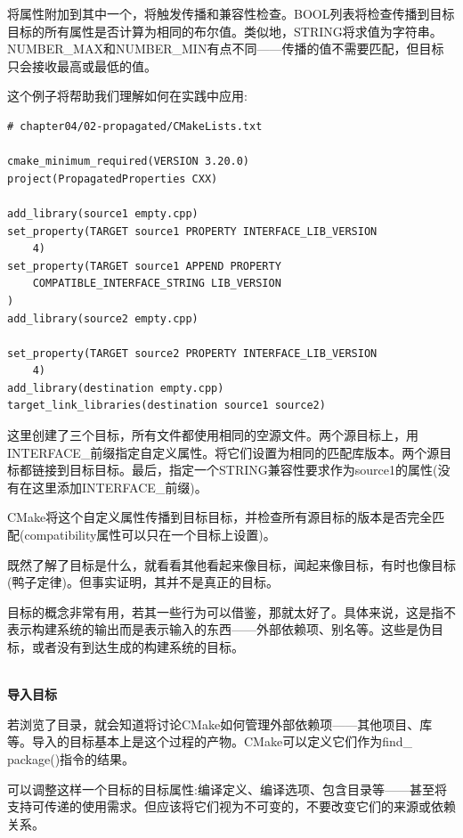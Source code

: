 将属性附加到其中一个，将触发传播和兼容性检查。BOOL列表将检查传播到目标目标的所有属性是否计算为相同的布尔值。类似地，STRING将求值为字符串。NUMBER\_MAX和NUMBER\_MIN有点不同——传播的值不需要匹配，但目标只会接收最高或最低的值。

这个例子将帮助我们理解如何在实践中应用:

\begin{lstlisting}[style=styleCMake]
# chapter04/02-propagated/CMakeLists.txt

cmake_minimum_required(VERSION 3.20.0)
project(PropagatedProperties CXX)

add_library(source1 empty.cpp)
set_property(TARGET source1 PROPERTY INTERFACE_LIB_VERSION
	4)
set_property(TARGET source1 APPEND PROPERTY
	COMPATIBLE_INTERFACE_STRING LIB_VERSION
)
add_library(source2 empty.cpp)

set_property(TARGET source2 PROPERTY INTERFACE_LIB_VERSION
	4)
add_library(destination empty.cpp)
target_link_libraries(destination source1 source2)
\end{lstlisting}

这里创建了三个目标，所有文件都使用相同的空源文件。两个源目标上，用INTERFACE\_前缀指定自定义属性。将它们设置为相同的匹配库版本。两个源目标都链接到目标目标。最后，指定一个STRING兼容性要求作为source1的属性(没有在这里添加INTERFACE\_前缀)。

CMake将这个自定义属性传播到目标目标，并检查所有源目标的版本是否完全匹配(compatibility属性可以只在一个目标上设置)。

既然了解了目标是什么，就看看其他看起来像目标，闻起来像目标，有时也像目标(鸭子定律)。但事实证明，其并不是真正的目标。


目标的概念非常有用，若其一些行为可以借鉴，那就太好了。具体来说，这是指不表示构建系统的输出而是表示输入的东西——外部依赖项、别名等。这些是伪目标，或者没有到达生成的构建系统的目标。

\hspace*{\fill} \\ %
\noindent
\textbf{导入目标}

若浏览了目录，就会知道将讨论CMake如何管理外部依赖项——其他项目、库等。导入的目标基本上是这个过程的产物。CMake可以定义它们作为find\_ package()指令的结果。

可以调整这样一个目标的目标属性:编译定义、编译选项、包含目录等——甚至将支持可传递的使用需求。但应该将它们视为不可变的，不要改变它们的来源或依赖关系。

